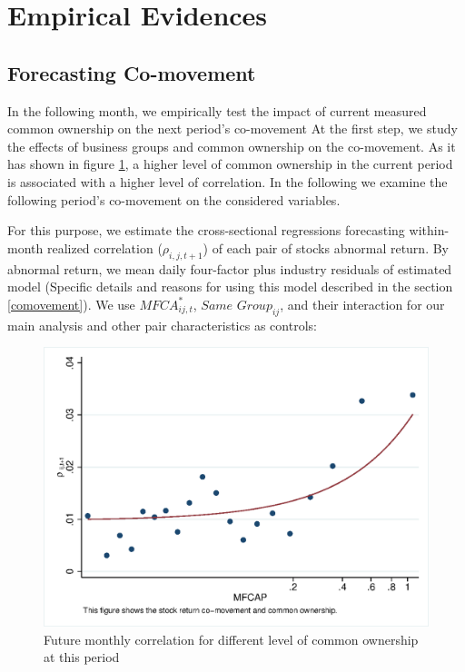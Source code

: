
\section{Empirical Evidences}



\subsection{{Forecasting Co-movement}}
\label{Forecasting Co-movement}

	In the following month, we empirically test the impact of current measured
	common ownership on the next period’s co-movement
	At the first step, we study the effects of business groups and common ownership on the co-movement. As it has shown in figure \ref{mcorr50}, a higher level of common	ownership in the current period is associated with a higher level of correlation. In the following we examine the following period's co-movement on the considered variables.
	
	
	For this purpose, we estimate the cross-sectional regressions forecasting within-month realized correlation ($\rho_{i,j,t+1}$) of each pair of stocks abnormal return. By abnormal return, we mean daily four-factor plus industry residuals of estimated model (Specific details and reasons for using this model described in the section \ref{comovement}). We use $\textit{MFCA}^*_{ij,t}$, $\textit{Same Group}_{ij} $, and their interaction for our main analysis and other pair characteristics as controls:
	
	\begin{figure}[htbp]
		\centering  
		\centering
		\includegraphics[width=0.7\linewidth]{"Output/mcorr50.eps"} 
		\caption{Future monthly correlation for different level of common ownership at this period }
		\label{mcorr50}
	\end{figure}
	
